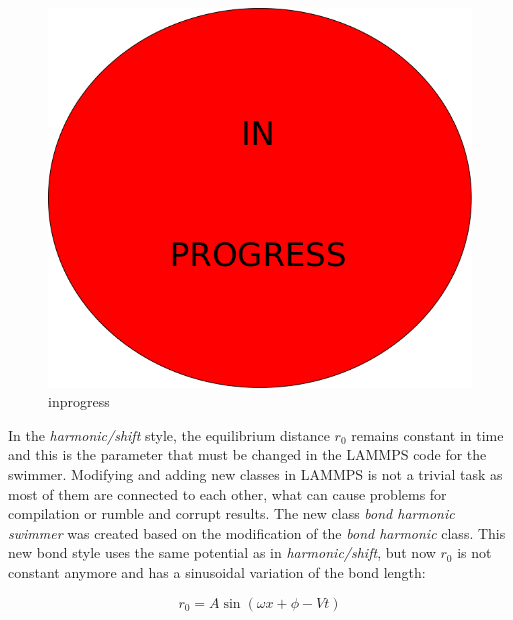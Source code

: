 \begin{figure}
\centering
  \begin{footnotesize}
  \includegraphics[scale=0.25]{images/in-progress.png}
  \caption[inprogress]{inprogress}
  \label{fig:Bild3.3}
  \end{footnotesize}
\end{figure} 

In the \textit{harmonic/shift} style, the equilibrium distance $r_{0}$ remains constant in time and this is the parameter that must be changed in the LAMMPS code for the swimmer. Modifying and
adding new classes in LAMMPS is not a trivial task as most of them are connected to each other, what can cause problems for compilation or rumble and corrupt results. The new class
\textit{bond harmonic swimmer} was created based on the modification of the \textit{bond harmonic} class. This new  bond style uses the same potential as in \textit{harmonic/shift}, but now $r_{0}$
is not constant anymore and has a sinusoidal variation of the bond length:

\begin{equation}\label{r0}
  r_{0} = A  \sin (\omega x + \phi - Vt)
\end{equation}

